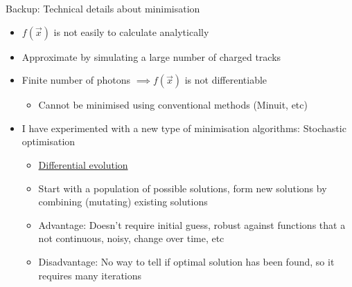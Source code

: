 \documentclass{beamer}
\begin{document}
\begin{frame}{Backup: Technical details about minimisation}
  \setlength\itemsep{1.0em}
  \begin{itemize}
    \item{$f(\vec{x})$ is not easily to calculate analytically}
    \item{Approximate by simulating a large number of charged tracks}
    \item{Finite number of photons $\implies f(\vec{x})$ is not differentiable}
    \begin{itemize}
      \item{Cannot be minimised using conventional methods (Minuit, etc)}
    \end{itemize}
    \item{I have experimented with a new type of minimisation algorithms: Stochastic optimisation}
    \begin{itemize}
      \item{\href{https://en.wikipedia.org/wiki/Differential_evolution}{Differential evolution}}
      \item{Start with a population of possible solutions, form new solutions by combining (mutating) existing solutions}
      \item{Advantage: Doesn't require initial guess, robust against functions that a not continuous, noisy, change over time, etc}
      \item{Disadvantage: No way to tell if optimal solution has been found, so it requires many iterations}
    \end{itemize}
  \end{itemize}
\end{frame}
\end{document}
